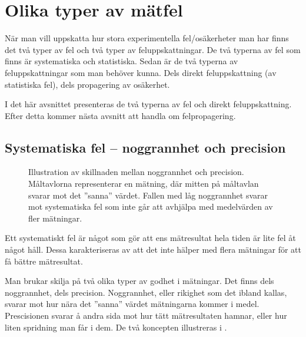 \documentclass[11pt,a4paper, swedish
]{article}
\begin{document}
\section{Olika typer av mätfel}\label{sec:matfel}
När man vill uppskatta hur stora experimentella fel/osäkerheter man
har finns det två typer av fel och två typer av feluppskattningar. De
två typerna av fel som finns är systematiska och statistiska. Sedan är
de två typerna av feluppskattningar som man behöver kunna. Dels direkt
feluppskattning (av statistiska fel), dels propagering av osäkerhet. 

I det här avsnittet presenteras de två typerna av fel och direkt
feluppskattning. Efter detta kommer nästa avsnitt att handla om
felpropagering. 


\subsection{Systematiska fel -- noggrannhet och precision}
\begin{figure}
\centering
\resizebox{0.5\textwidth}{!}{

}
\caption{Illustration av skillnaden mellan noggrannhet och
  precision. Måltavlorna representerar en mätning, där mitten på
  måltavlan svarar mot det ''sanna'' värdet. Fallen med låg
  noggrannhet svarar mot systematiska fel som inte går att avhjälpa
  med medelvärden av fler mätningar.}
\label{fig:prec_nog}
\end{figure}

Ett systematiskt fel är något som gör att ens mätresultat hela tiden
är lite fel åt något håll\footnotemark{}. Dessa karakteriseras av att
det inte hälper med flera mätningar för att få bättre mätresultat.

Man brukar skilja på två olika typer av godhet i mätningar. Det finns
dels noggrannhet, dels precision. Noggrannhet, eller rikighet som det
ibland kallas, svarar mot hur nära det ''sanna''\footnotemark{} värdet
mätningarna kommer i medel. Prescisionen svarar å andra sida mot hur
tätt mätresultaten hamnar, eller hur liten spridning man får i dem. De
två koncepten illustreras i .  
\end{document}

